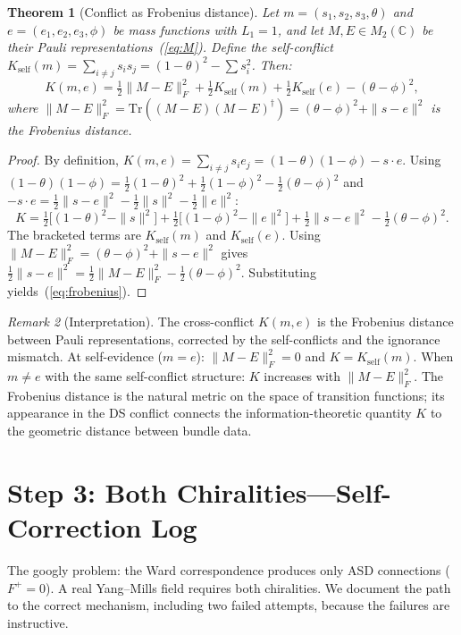 \documentclass[11pt,a4paper]{article}
\newtheorem{theorem}{Theorem}[section]
\theoremstyle{definition}
\theoremstyle{remark}
\newtheorem{remark}[theorem]{Remark}
\newcommand{\C}{\mathbb{C}}
\newcommand{\Tr}{\mathrm{Tr}}
\begin{document}
\begin{theorem}[Conflict as Frobenius distance]\label{thm:frobenius}
Let $m=(s_1,s_2,s_3,\theta)$ and $e=(e_1,e_2,e_3,\phi)$ be mass functions with $L_1=1$, and let $M,E\in M_2(\C)$ be their Pauli representations~(\ref{eq:M}). Define the self-conflict $K_{\mathrm{self}}(m)=\sum_{i\neq j}s_is_j=(1-\theta)^2-\sum s_i^2$. Then:
\begin{equation}\label{eq:frobenius}
K(m,e)=\tfrac{1}{2}\|M-E\|_F^2+\tfrac{1}{2}K_{\mathrm{self}}(m)+\tfrac{1}{2}K_{\mathrm{self}}(e)-(\theta-\phi)^2,
\end{equation}
where $\|M-E\|_F^2=\Tr((M-E)(M-E)^\dagger)=(\theta-\phi)^2+\|s-e\|^2$ is the Frobenius distance.
\end{theorem}

\begin{proof}
By definition, $K(m,e)=\sum_{i\neq j}s_ie_j=(1-\theta)(1-\phi)-s\cdot e$. Using $(1-\theta)(1-\phi)=\tfrac{1}{2}(1-\theta)^2+\tfrac{1}{2}(1-\phi)^2-\tfrac{1}{2}(\theta-\phi)^2$ and $-s\cdot e=\tfrac{1}{2}\|s-e\|^2-\tfrac{1}{2}\|s\|^2-\tfrac{1}{2}\|e\|^2$:
\[
K=\tfrac{1}{2}\bigl[(1-\theta)^2-\|s\|^2\bigr]+\tfrac{1}{2}\bigl[(1-\phi)^2-\|e\|^2\bigr]+\tfrac{1}{2}\|s-e\|^2-\tfrac{1}{2}(\theta-\phi)^2.
\]
The bracketed terms are $K_{\mathrm{self}}(m)$ and $K_{\mathrm{self}}(e)$. Using $\|M-E\|_F^2=(\theta-\phi)^2+\|s-e\|^2$ gives $\tfrac{1}{2}\|s-e\|^2=\tfrac{1}{2}\|M-E\|_F^2-\tfrac{1}{2}(\theta-\phi)^2$. Substituting yields~(\ref{eq:frobenius}).
\end{proof}

\begin{remark}[Interpretation]
The cross-conflict $K(m,e)$ is the Frobenius distance between Pauli representations, corrected by the self-conflicts and the ignorance mismatch. At self-evidence ($m=e$): $\|M-E\|_F^2=0$ and $K=K_{\mathrm{self}}(m)$. When $m\neq e$ with the same self-conflict structure: $K$ increases with $\|M-E\|_F^2$. The Frobenius distance is the natural metric on the space of transition functions; its appearance in the DS conflict connects the information-theoretic quantity $K$ to the geometric distance between bundle data.
\end{remark}


\section{Step 3: Both Chiralities---Self-Correction Log}\label{sec:googly}

The googly problem: the Ward correspondence produces only ASD connections ($F^+=0$). A real Yang--Mills field requires both chiralities. We document the path to the correct mechanism, including two failed attempts, because the failures are instructive.
\end{document}
